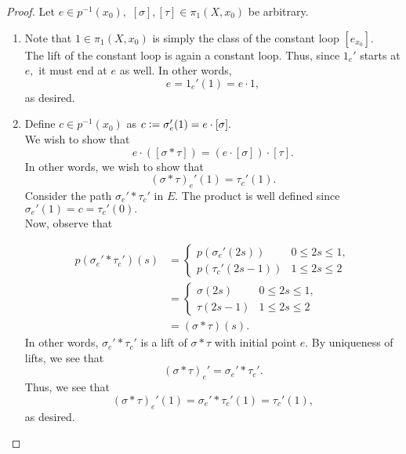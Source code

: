 \documentclass[12pt]{article}
\theoremstyle{definition}
\numberwithin{thm}{section}
\begin{document}
\begin{proof} 
	Let $e \in p^{-1}(x_0),$ $[\sigma], [\tau] \in \pi_1(X, x_0)$ be arbitrary.
	\begin{enumerate}
		\item Note that $1 \in \pi_1(X, x_0)$ is simply the class of the constant loop $[e_{x_0}].$\\
		The lift of the constant loop is again a constant loop. Thus, since $1_e'$ starts at $e,$ it must end at $e$ as well. In other words,
		\begin{equation*} 
			e = 1_e'(1) = e\cdot 1,
		\end{equation*}
		as desired.
		\item Define $c \in p^{-1}(x_0)$ as $c \vcentcolon= \sigma_e'(1) = e\cdot[\sigma].$\\
		We wish to show that
		\begin{equation*} 
			e\cdot([\sigma*\tau]) = (e \cdot [\sigma])\cdot[\tau].
		\end{equation*}
		In other words, we wish to show that
		\begin{equation*} 
			(\sigma*\tau)_e'(1) = \tau_c'(1).
		\end{equation*}
		Consider the path $\sigma_e'*\tau_c'$ in $E.$ The product is well defined since $\sigma_e'(1) = c = \tau_c'(0).$\\
		Now, observe that

		\begin{align*} 
			p(\sigma_e'*\tau_c')(s) &= \begin{cases}
				p(\sigma_e'(2s)) & 0 \le 2s \le 1,\\
				p(\tau_c'(2s - 1)) & 1 \le 2s \le 2
			\end{cases}\\
			&= \begin{cases}
				\sigma(2s) & 0 \le 2s \le 1,\\
				\tau(2s - 1) & 1 \le 2s \le 2
			\end{cases}\\
			&= (\sigma*\tau)(s).
		\end{align*}
		In other words, $\sigma_e'*\tau_c'$ is a lift of $\sigma*\tau$ with initial point $e.$ By uniqueness of lifts, we see that
		\begin{equation*} 
			(\sigma*\tau)_e' = \sigma_e'*\tau_c'.
		\end{equation*}
		Thus, we see that
		\begin{equation*} 
			(\sigma*\tau)_e'(1) = \sigma_e'*\tau_c'(1) = \tau_c'(1),
		\end{equation*}
		as desired. \qedhere
	\end{enumerate}
\end{proof}
\end{document}
